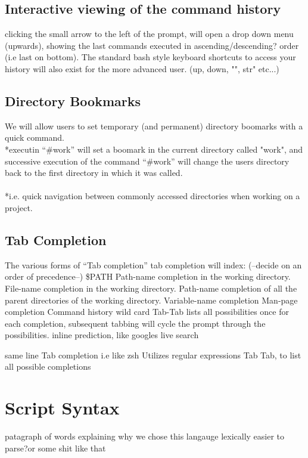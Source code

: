 \documentclass[a4paper,11pt]{article}
\begin{document}
\subsection*{Interactive viewing of the command history}
clicking the small arrow to the left of the prompt, will open a drop down menu (upwards), showing the last commands executed in ascending/descending? order (i.e last on bottom). The standard bash style keyboard shortcuts to access your history will also exist for the
more advanced user. (up, down, "", str" etc...)

\subsection*{Directory Bookmarks}
We will allow users to set temporary (and permanent) directory boomarks with a quick command.
\\*executin ``\#work'' will set a boomark in the current directory called "work", and successive execution of the command ``\#work'' will change the users directory back to the first directory in which it was called.
\\\\*i.e. quick navigation between commonly accessed directories when working on a project.

\subsection*{Tab Completion}

The various forms of ``Tab completion''
tab completion will index: (--decide on an order of precedence--)
 \$PATH
 Path-name completion in the working directory.
 File-name completion in the working directory.
 Path-name completion of all the parent directories of the working directory.
 Variable-name completion
 Man-page completion
 Command history
wild card \*
Tab-Tab lists all possibilities once for each completion, subsequent tabbing will cycle the
prompt through the possibilities.
inline prediction, like googles live search

same line Tab completion i.e like zsh
Utilizes regular expressions
Tab Tab, to list all possible completions

\pagebreak
\section{Script Syntax}

patagraph of words explaining why we chose this langauge
lexically easier to parse?or some shit like that
\end{document}
